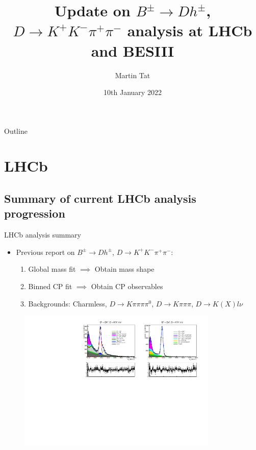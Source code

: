 \documentclass{beamer}
\title[$K^+K^-\pi^+\pi^-$]{Update on \texorpdfstring{$B^\pm\to Dh^\pm$}{B to Dh}, \texorpdfstring{$D\to K^+K^-\pi^+\pi^-$}{K+K-pi+pi-} analysis at LHCb and BESIII}
\author{Martin Tat}
\institute{Oxford LHCb}
\date{10th January 2022}
\begin{document}
\begin{frame}
  \titlepage
\end{frame}

\begin{frame}{Outline}
  \tableofcontents
\end{frame}

\section{LHCb}
\subsection{Summary of current LHCb analysis progression}

\begin{frame}{LHCb analysis summary}
  \begin{itemize}
    \setlength\itemsep{0.5em}
    \item{Previous report on $B^\pm\to Dh^\pm$, $D\to K^+K^-\pi^+\pi^-$:}
    \begin{enumerate}
      \setlength\itemsep{0.5em}
      \item{Global mass fit $\implies$ Obtain mass shape}
      \item{Binned CP fit $\implies$ Obtain CP observables}
      \item{Backgrounds: Charmless, $D\to K\pi\pi\pi\pi^0$, $D\to K\pi\pi\pi$, $D\to K(X)l\nu$}
    \end{enumerate}
  \end{itemize}
  \begin{figure}
    \includegraphics[width = 0.85\textwidth]{Plots/d2kkpipi_fiveL_allDP.pdf}
  \end{figure}
\end{frame}
\end{document}
